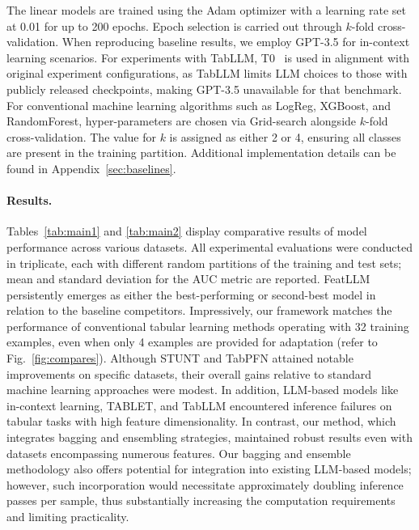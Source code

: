 The linear models are trained using the Adam optimizer with a learning rate set at 0.01 for up to 200 epochs. Epoch selection is carried out through $k$-fold cross-validation. When reproducing baseline results, we employ GPT-3.5 for in-context learning scenarios. For experiments with TabLLM, T0~\cite{sanh2022multitask} is used in alignment with original experiment configurations, as TabLLM limits LLM choices to those with publicly released checkpoints, making GPT-3.5 unavailable for that benchmark. For conventional machine learning algorithms such as LogReg, XGBoost, and RandomForest, hyper-parameters are chosen via Grid-search alongside $k$-fold cross-validation. The value for $k$ is assigned as either 2 or 4, ensuring all classes are present in the training partition. Additional implementation details can be found in Appendix~\ref{sec:baselines}.

\vspace*{-0.12in}
\paragraph{Results.}
Tables~\ref{tab:main1} and \ref{tab:main2} display comparative results of model performance across various datasets. All experimental evaluations were conducted in triplicate, each with different random partitions of the training and test sets; mean and standard deviation for the AUC metric are reported. \textsf{FeatLLM} persistently emerges as either the best-performing or second-best model in relation to the baseline competitors. Impressively, our framework matches the performance of conventional tabular learning methods operating with 32 training examples, even when only 4 examples are provided for adaptation (refer to Fig.~\ref{fig:compares}). Although STUNT and TabPFN attained notable improvements on specific datasets, their overall gains relative to standard machine learning approaches were modest. In addition, LLM-based models like in-context learning, TABLET, and TabLLM encountered inference failures on tabular tasks with high feature dimensionality. In contrast, our method, which integrates bagging and ensembling strategies, maintained robust results even with datasets encompassing numerous features. Our bagging and ensemble methodology also offers potential for integration into existing LLM-based models; however, such incorporation would necessitate approximately doubling inference passes per sample, thus substantially increasing the computation requirements and limiting practicality.

